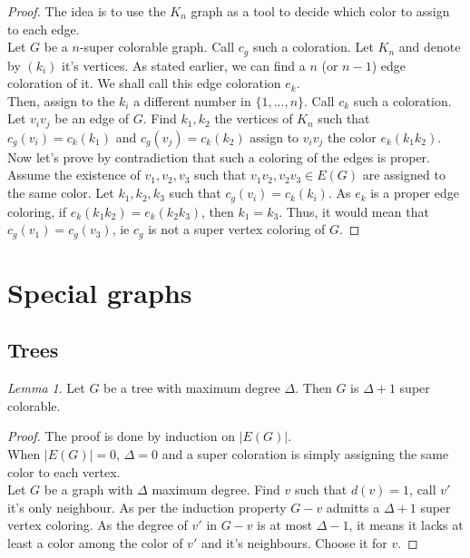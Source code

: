\documentclass[12pt]{article}
\theoremstyle{definition}
\theoremstyle{remark}
\newtheorem{lemma}[theorem]{Lemma}
\begin{document}
\begin{proof} 
The idea is to use the $K_n$ graph as a tool to decide which color to assign to each edge. \\
Let $G$ be a $n$-super colorable graph. Call $c_g$ such a coloration. Let $K_n$ and denote by $(k_i)$ it's vertices. As stated earlier,
we can find a $n$ (or $n-1$) edge coloration of it. We shall call this edge coloration $e_k$.  \\
Then, assign to the $k_i$ a different number in $\{1,... , n\}$. Call $c_k$ such a coloration. \\
Let $v_i v_j$ be an edge of $G$. Find $k_1, k_2$ the vertices of $K_n$ such that $c_g(v_i) = c_k(k_1)$ and $c_g(v_j) = c_k(k_2)$ assign to $v_iv_j$ the color 
$e_k(k_1k_2)$. \\
Now let's prove by contradiction that such a coloring of the edges is proper. Assume the existence of $v_1, v_2, v_3$ such that $v_1v_2, v_2v_3 \in E(G)$ are assigned to the same color.
Let $k_1, k_2, k_3$ such that $c_g(v_i) = c_k(k_i)$. As $e_k$ is a proper edge coloring, if $e_k(k_1k_2) = e_k(k_2k_3)$, then $k_1=k_3$. Thus, it would mean that
$c_g(v_1) = c_g(v_3)$, ie $c_g$ is not a super vertex coloring of $G$.
\end{proof}

\section{Special graphs}

\subsection{Trees}

\begin{lemma}
    Let $G$ be a tree with maximum degree $\Delta$. Then $G$ is $\Delta + 1$ super colorable.
\end{lemma}

\begin{proof}
    The proof is done by induction on $|E(G)|$.\\
    When $|E(G)| = 0$, $\Delta = 0$ and a super coloration is simply assigning the same color to each vertex.\\
    Let $G$ be a graph with $\Delta$ maximum degree. Find $v$ such that $d(v)=1$, call $v'$ it's only neighbour. 
    As per the induction property $G-v$ admitts a $\Delta +1$ super vertex coloring. As the degree of $v'$ in $G-v$ is at most $\Delta -1$, it means it 
    lacks at least a color among the color of $v'$ and it's neighbours. Choose it for $v$.
\end{proof}
\end{document}
